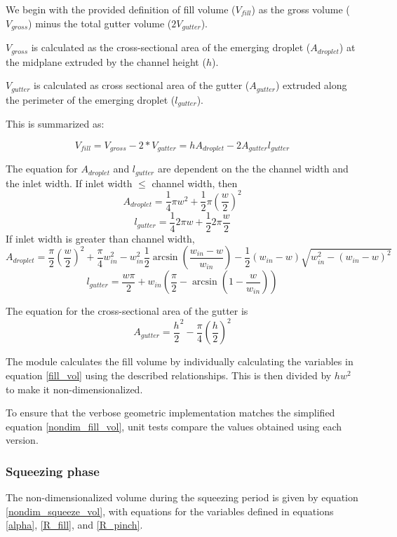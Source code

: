 We begin with the provided definition of fill volume ($V_{fill}$) as the gross volume
($V_{gross}$) minus the total gutter volume ($2V_{gutter}$).

$V_{gross}$ is calculated as the cross-sectional area of the emerging droplet ($A_{droplet}$)
at the midplane extruded by the channel height ($h$).

$V_{gutter}$ is calculated as cross sectional area of the gutter ($A_{gutter}$) extruded along
the perimeter of the emerging droplet ($l_{gutter}$).

This is summarized as:

\begin{equation}
  V_{fill} = V_{gross} - 2*V_{gutter} = hA_{droplet} - 2A_{gutter}l_{gutter} \label{fill_vol}
\end{equation}

The equation for $A_{droplet}$ and $l_{gutter}$ are dependent on the the channel width and the inlet width. If inlet width $\leq$
channel width, then
$$A_{droplet} = \frac{1}{4}{\pi}w^2 + \frac{1}{2}{\pi}\left(\frac{w}{2}\right)^2$$
$$l_{gutter} = \frac{1}{4}2{\pi}w + \frac{1}{2}2{\pi}\frac{w}{2}$$
If inlet width is greater than channel width,
$$A_{droplet} = \frac{\pi}{2}\left(\frac{w}{2}\right)^2 +
\frac{\pi}{4}w_{in}^2 -
w_{in}^2\frac{1}{2}\arcsin{\left(\frac{w_{in}-w}{w_{in}}\right)} -
\frac{1}{2}\left(w_{in}-w\right)\sqrt{w_{in}^2 - \left(w_{in}-w\right)^2}$$
$$l_{gutter} = \frac{w\pi}{2}+w_{in}\left(\frac{\pi}{2}-\arcsin\left(1-\frac{w}{w_{in}}\right)\right)$$

\par
The equation for the cross-sectional area of the gutter is 
$$A_{gutter} = \frac{h}{2}^2-\frac{\pi}{4}\left(\frac{h}{2}\right)^2$$
\par

The module calculates the fill volume by individually calculating the variables in equation
\eqref{fill_vol} using the described relationships.
This is then divided by $hw^2$ to make it non-dimensionalized.

To ensure that the verbose geometric implementation matches the simplified equation \eqref{nondim_fill_vol}, 
unit tests compare the values obtained using each version.

\subsubsection{Squeezing phase}
The non-dimensionalized volume during the squeezing period is given by equation \eqref{nondim_squeeze_vol}, with
equations for the variables defined in equations \eqref{alpha}, \eqref{R_fill}, and \eqref{R_pinch}.

